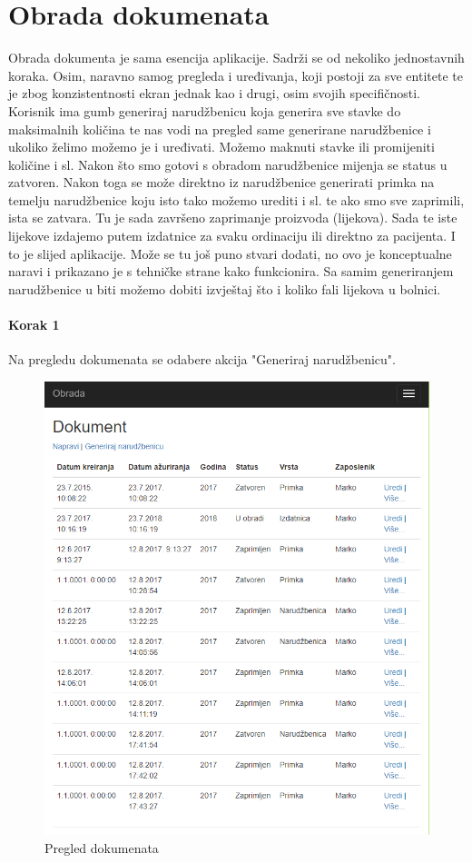\documentclass[a4paper,12pt]{foi}
\begin{document}
\section{Obrada dokumenata}

Obrada dokumenta je sama esencija aplikacije. Sadrži se od nekoliko jednostavnih koraka. Osim, naravno samog pregleda i uređivanja, koji postoji za sve entitete te je zbog konzistentnosti ekran jednak kao i drugi, osim svojih specifičnosti. Korisnik ima gumb generiraj narudžbenicu koja generira sve stavke do maksimalnih količina te nas vodi na pregled same generirane narudžbenice i ukoliko želimo možemo je i uređivati. Možemo maknuti stavke ili promijeniti količine i sl. Nakon što smo gotovi s obradom narudžbenice mijenja se status u zatvoren. Nakon toga se može direktno iz narudžbenice generirati primka na temelju narudžbenice koju isto tako možemo urediti i sl. te ako smo sve zaprimili, ista se zatvara. Tu je sada završeno zaprimanje proizvoda (lijekova). Sada te iste lijekove izdajemo putem izdatnice za svaku ordinaciju ili direktno za pacijenta. I to je slijed aplikacije. Može se tu još puno stvari dodati, no ovo je konceptualne naravi i prikazano je s tehničke strane kako funkcionira. Sa samim generiranjem narudžbenice u biti možemo dobiti izvještaj što i koliko fali lijekova u bolnici.

\paragraph{Korak 1}
Na pregledu dokumenata se odabere akcija "Generiraj narudžbenicu".

\begin{figure}[h]
\centering 
\includegraphics[height=0.95\textwidth]{dokument_pocetna.png}
\caption{Pregled dokumenata}
\label{slika-7}
\end{figure}
\end{document}
